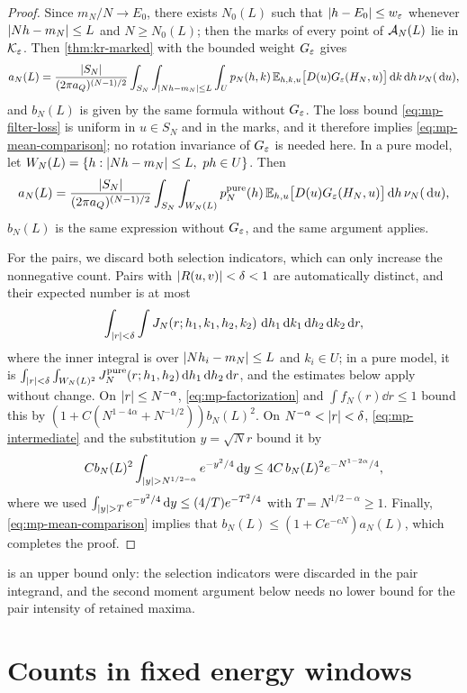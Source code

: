 \begin{proof}
Since $m_N/N\to E_0$, there exists $N_0(L)$ such that $\left|h-E_0\right|\le w_\varepsilon$ whenever $\left|Nh-m_N\right|\le L$ and $N\ge N_0(L)$; then the marks of every point of $\mathcal A_N(L)$ lie in $\mathcal K_\varepsilon$. Then \cref{thm:kr-marked} with the bounded weight $G_\varepsilon$ gives
\[
a_N(L)=\frac{\left|S_N\right|}{(2\pi a_Q)^{(N-1)/2}}\int_{S_N}\int_{\left|Nh-m_N\right|\le L}\int_Up_N(h,k)\,\mathbb E_{h,k,u}\bigl[D(u)G_\varepsilon(H_N,u)\bigr]\,\mathrm d k\,\mathrm d h\,\nu_N(\,\mathrm d u),
\]
and $b_N(L)$ is given by the same formula without $G_\varepsilon$. The loss bound \eqref{eq:mp-filter-loss} is uniform in $u\in S_N$ and in the marks, and it therefore implies \eqref{eq:mp-mean-comparison}; no rotation invariance of $G_\varepsilon$ is needed here. In a pure model, let $W_N(L)=\{h:\left|Nh-m_N\right|\le L,\ ph\in U\}$. Then
\[
a_N(L)=\frac{\left|S_N\right|}{(2\pi a_Q)^{(N-1)/2}}\int_{S_N}\int_{W_N(L)}p^{\rm pure}_N(h)\,\mathbb E_{h,u}\bigl[D(u)G_\varepsilon(H_N,u)\bigr]\,\mathrm d h\,\nu_N(\,\mathrm d u),
\]
$b_N(L)$ is the same expression without $G_\varepsilon$, and the same argument applies.

For the pairs, we discard both selection indicators, which can only increase the nonnegative count. Pairs with $\left|R(u,v)\right|<\delta<1$ are automatically distinct, and their expected number is at most
\[
\int_{\left|r\right|<\delta}\int J_N(r;h_1,k_1,h_2,k_2)\,\,\mathrm d h_1\,\mathrm d k_1\,\mathrm d h_2\,\mathrm d k_2\,\mathrm d r,
\]
where the inner integral is over $\left|Nh_i-m_N\right|\le L$ and $k_i\in U$; in a pure model, it is $\int_{\left|r\right|<\delta}\int_{W_N(L)^2}J_N^{\rm pure}(r;h_1,h_2)\,\mathrm d h_1\,\mathrm d h_2\,\mathrm d r$, and the estimates below apply without change. On $\left|r\right|\le N^{-\alpha}$, \eqref{eq:mp-factorization} and $\int f_N(r)\dd r\le1$ bound this by $(1+C(N^{1-4\alpha}+N^{-1/2}))b_N(L)^2$. On $N^{-\alpha}<\left|r\right|<\delta$, \eqref{eq:mp-intermediate} and the substitution $y=\sqrt Nr$ bound it by
\[
Cb_N(L)^2\int_{\abs y>N^{1/2-\alpha}}e^{-y^2/4}\dd y\le4C\,b_N(L)^2e^{-N^{1-2\alpha}/4},
\]
where we used $\int_{\abs y>T}e^{-y^2/4}\dd y\le(4/T)e^{-T^2/4}$ with $T=N^{1/2-\alpha}\ge1$. Finally, \eqref{eq:mp-mean-comparison} implies that $b_N(L)\le(1+Ce^{-cN})a_N(L)$, which completes the proof.
\end{proof}

 is an upper bound only: the selection indicators were discarded in the pair integrand, and the second moment argument below needs no lower bound for the pair intensity of retained maxima.


\section{Counts in fixed energy windows}\label{sec:mp-counts}

